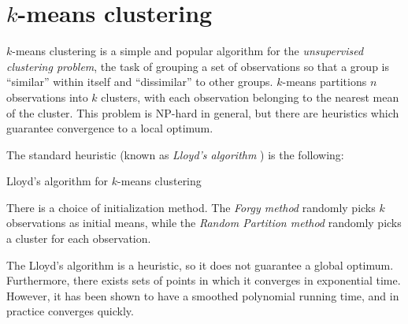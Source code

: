\documentclass[../tech_report_1.tex]{subfiles}
\begin{document}
\section{$k$-means clustering}

$k$-means clustering is a simple and popular algorithm for the \textit{unsupervised clustering
problem}, the task of grouping a set of observations so that a group
is ``similar'' within itself and ``dissimilar'' to other groups.
$k$-means partitions $n$ observations into $k$ clusters, with each
observation belonging to the nearest mean of the cluster. This problem
is NP-hard in general, but there are heuristics which guarantee convergence
to a local optimum.

The standard heuristic (known as \textit{Lloyd's algorithm}  \cite{llyod1982kmeans}) is the
following:

\begin{algorithm}
\caption{Lloyd's algorithm for $k$-means clustering}


\begin{algorithmic}[1]
\EndWhile
\end{algorithmic} 
\end{algorithm}


There is a choice of initialization method. The \textit{Forgy method}
randomly picks $k$ observations as initial means, while the \textit{Random
Partition method} randomly picks a cluster for each observation.

The Lloyd's algorithm is a heuristic, so it does not guarantee a global
optimum. Furthermore, there exists sets of points in which it converges
in exponential time. However, it has been shown to have a smoothed
polynomial running time, and in practice converges quickly.
\end{document}
